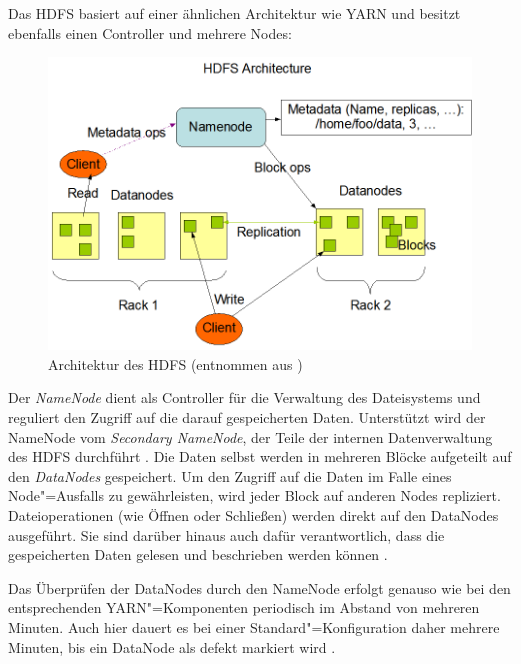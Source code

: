 Das HDFS basiert auf einer ähnlichen Architektur wie YARN und besitzt ebenfalls einen Controller und mehrere Nodes:

\begin{figure}[h]
    \includegraphics{./resources/hdfsarchitecture.png}
    \caption[Architektur des HDFS]
    {Architektur des \acrshort{HDFS} (entnommen aus \cite{HadoopHdfsDesc271})}
    \label{fig:hdfsarch}
\end{figure}

Der \emph{NameNode} dient als Controller für die Verwaltung des Dateisystems und reguliert den Zugriff auf die darauf gespeicherten Daten.
Unterstützt wird der NameNode vom \emph{Secondary NameNode}, der Teile der internen Datenverwaltung des HDFS durchführt \cite{HadoopHdfsGuide271}.
Die Daten selbst werden in mehreren Blöcke aufgeteilt auf den \emph{DataNodes} gespeichert.
Um den Zugriff auf die Daten im Falle eines Node"=Ausfalls zu gewährleisten, wird jeder Block auf anderen Nodes repliziert.
Dateioperationen (wie Öffnen oder Schließen) werden direkt auf den DataNodes ausgeführt.
Sie sind darüber hinaus auch dafür verantwortlich, dass die gespeicherten Daten gelesen und beschrieben werden können \cite{Shvachko2010,HadoopHdfsDesc271}.

Das Überprüfen der DataNodes durch den NameNode erfolgt genauso wie bei den entsprechenden YARN"=Komponenten periodisch im Abstand von mehreren Minuten.
Auch hier dauert es bei einer Standard"=Konfiguration daher mehrere Minuten, bis ein DataNode als defekt markiert wird \cite{HadoopHdfsConfig271}.

